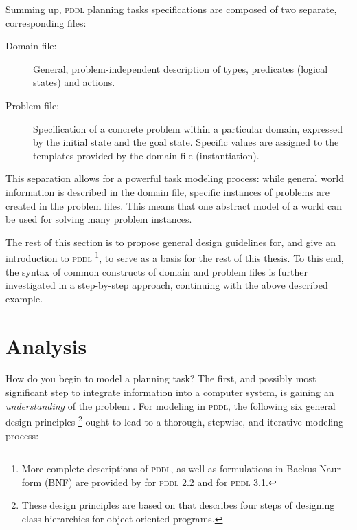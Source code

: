 \documentclass[a4paper,12pt]{report}
\begin{document}
Summing up, \textsc{pddl} planning tasks specifications
are composed of two separate, corresponding files:

\begin{description}
\item[{Domain file:}] General, problem-independent description of types,
predicates (logical states) and actions.

\item[{Problem file:}] Specification of a concrete problem within a
particular domain, expressed by the initial state
and the goal state. Specific values are assigned to
the templates provided by the domain file
(instantiation).
\end{description}
This separation allows for a powerful task modeling process: while
general world information is described in the domain file, specific
instances of problems are created in the problem files. This means
that one abstract model of a world can be used for solving many
problem instances.

The rest of this section is to propose general design guidelines for,
and give an introduction to \textsc{pddl} \footnote{More complete descriptions of \textsc{pddl}, as well as
formulations in Backus-Naur form (BNF) are provided by
\textcite{fox2003pddl2} for \textsc{pddl} 2.2 and
\textcite{kovacs2011bnf} for \textsc{pddl} 3.1.}, to serve as a basis
for the rest of this thesis. To this end, the syntax of common
constructs of domain and problem files is further investigated in a
step-by-step approach, continuing with the above described example.

\section{Analysis}
\label{sec-2-1}

How do you begin to model a planning task? The first, and possibly
most significant step to integrate information into a computer system,
is gaining an \emph{understanding} of the problem
\cite{polya2008solve,helmert2008understanding}. For modeling in
\textsc{pddl}, the following six general design principles \footnote{These design principles are based on
 that describes four steps of designing
class hierarchies for object-oriented programs.} ought to
lead to a thorough, stepwise, and iterative modeling process:
\end{document}
